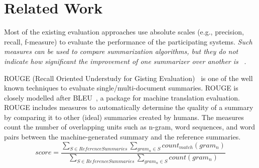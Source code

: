 \documentclass[a4paper]{report}
\begin{document}
\section{Related Work}
\label{rw}
Most of the existing evaluation approaches use absolute scales (e.g., precision, recall, f-measure) to evaluate the performance of the participating systems. \emph{Such measures can be used to compare summarization algorithms, but they do not indicate how significant the improvement of one summarizer over another is }~\cite{Goldstein:1999:STD:312624.312665}.
\par ROUGE (Recall Oriented Understudy for Gisting Evaluation)~\cite{Lin04rouge:a} is one of the well known techniques to evaluate single/multi-document summaries. ROUGE is closely modelled after BLEU~\cite{Papineni:2002:BMA:1073083.1073135}, a package for machine translation evaluation. ROUGE includes measures to automatically determine the quality of a summary by comparing it to other (ideal) summaries created by humans. The measures count the number of overlapping units such as n-gram, word sequences, and word pairs between the machine-generated summary and the reference summaries. 
\begin{equation*}
score = \frac {\sum_{ S \in ReferenceSummaries} \sum_{gram_n \in S}{count_{match}(gram_n)}}{{\sum_{ S \in ReferenceSummaries} \sum_{gram_n \in S}count (gram_n)}}
\end{equation*}
\end{document}
